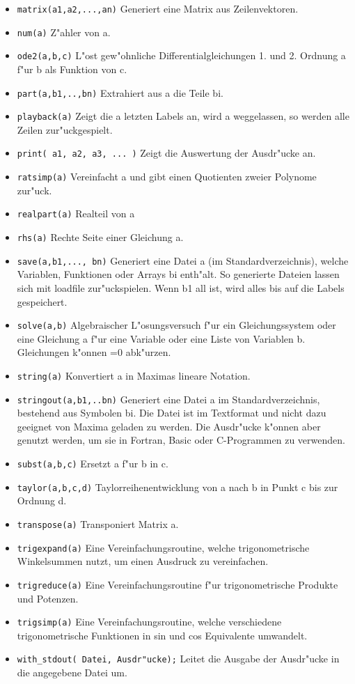 \documentclass[ngerman,12pt,a4paper]{article}
\begin{document}
\begin{itemize}
\item \verb|matrix(a1,a2,...,an)| Generiert eine Matrix aus Zeilenvektoren.
\item \verb|num(a)| Z"ahler von a.
\item \verb|ode2(a,b,c)| L"ost gew"ohnliche Differentialgleichungen 1. und 2. Ordnung a f"ur b als Funktion von c.
\item \verb|part(a,b1,..,bn)| Extrahiert aus a die Teile bi.
\item \verb|playback(a)| Zeigt die a letzten Labels an, wird a weggelassen, so werden alle Zeilen zur"uckgespielt.
\item \verb|print( a1, a2, a3, ... )| Zeigt die Auswertung der Ausdr"ucke an.
\item \verb|ratsimp(a)| Vereinfacht a und gibt einen Quotienten zweier Polynome zur"uck.
\item \verb|realpart(a)| Realteil von a
\item \verb|rhs(a)| Rechte Seite einer Gleichung a.
\item \verb|save(a,b1,..., bn)| Generiert eine Datei a (im Standardverzeichnis), welche Variablen, Funktionen oder Arrays bi enth"alt. So generierte Dateien lassen sich mit loadfile zur"uckspielen. Wenn b1 all ist, wird alles bis auf die Labels gespeichert.
\item \verb|solve(a,b)| Algebraischer L"osungsversuch f"ur ein Gleichungssystem oder eine Gleichung a f"ur eine Variable oder eine Liste von Variablen b. Gleichungen k"onnen =0 abk"urzen.
\item \verb|string(a)| Konvertiert a in Maximas lineare Notation.
\item \verb|stringout(a,b1,..bn)| Generiert eine Datei a im Standardverzeichnis, bestehend aus Symbolen bi. Die Datei ist im Textformat und nicht dazu geeignet von Maxima geladen zu werden. Die Ausdr"ucke k"onnen aber genutzt werden, um sie in Fortran, Basic oder C-Programmen zu verwenden.
\item \verb|subst(a,b,c)| Ersetzt a f"ur b in c.
\item \verb|taylor(a,b,c,d)| Taylorreihenentwicklung von a nach b in Punkt c bis zur Ordnung d.
\item \verb|transpose(a)| Transponiert Matrix a.
\item \verb|trigexpand(a)| Eine Vereinfachungsroutine, welche trigonometrische Winkelsummen nutzt, um einen Ausdruck zu vereinfachen.
\item \verb|trigreduce(a)| Eine Vereinfachungsroutine f"ur trigonometrische Produkte und Potenzen.
\item \verb|trigsimp(a)| Eine Vereinfachungsroutine, welche verschiedene trigonometrische Funktionen in sin und cos Equivalente umwandelt.
\item \verb|with_stdout( Datei, Ausdr"ucke);| Leitet die Ausgabe der Ausdr"ucke in die angegebene Datei um.
\end{itemize}
\end{document}
